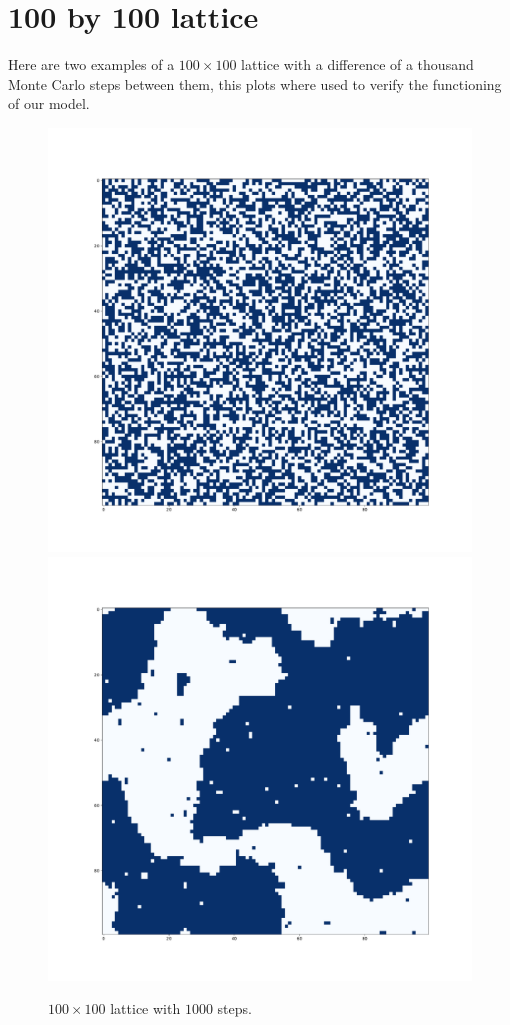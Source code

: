 \documentclass[
    10pt,
    journal,
    compsoc,
    english
]{IEEEtran}
\begin{document}
\section{100 by 100 lattice}
Here are two examples of a $100\times100$ lattice with a difference of a thousand Monte Carlo steps between them, this plots where used to verify the functioning of our model.
\begin{figure}[hbt]
    \centering
    \includegraphics[width=0.7\columnwidth]{img/100i.pdf}
    \includegraphics[width=0.7\columnwidth]{img/100f.pdf}
    \caption{$100\times100$ lattice with $1000$ steps.}
    \label{fig:100}
\end{figure}
\end{document}
